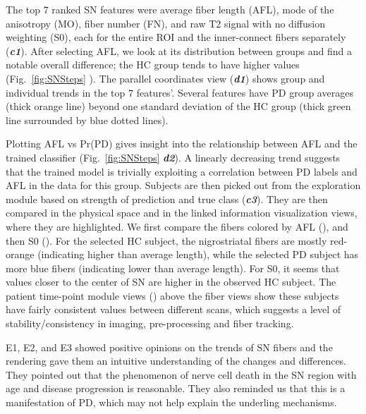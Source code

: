 The top $7$ ranked SN features were average fiber length (AFL), mode of the anisotropy (MO), fiber number (FN), and raw T2 signal with no diffusion weighting (S0), each for the entire ROI and the inner-connect fibers separately (\textbf{\textit{c1}}). After selecting AFL, we look at its distribution between groups and find a notable overall difference; the HC group tends to have higher values (Fig.~\ref{fig:SNSteps} ). The parallel coordinates view (\textbf{\textit{d1}}) shows group and individual trends in the top $7$ features'. Several features have PD group averages (thick orange line) beyond one standard deviation of the HC group (thick green line surrounded by blue dotted lines).

Plotting AFL vs Pr(PD) gives insight into the relationship between AFL and the trained classifier (Fig.~\ref{fig:SNSteps}  \textbf{\textit{d2}}). A linearly decreasing trend suggests that the trained model is trivially exploiting a correlation between PD labels and AFL in the data for this group. Subjects are then picked out from the exploration module based on strength of prediction and true class (\textbf{\textit{c3}}). They are then compared in the physical space and in the linked information visualization views, where they are highlighted. We first compare the fibers colored by AFL (), and then S0 (). For the selected HC subject, the nigrostriatal fibers are mostly red-orange (indicating higher than average length), while the selected PD subject has more blue fibers (indicating lower than average length). For S0, it seems that values closer to the center of SN are higher in the observed HC subject. The patient time-point module views () above the fiber views show these subjects have fairly consistent values between different scans, which suggests a level of stability/consistency in imaging, pre-processing and fiber tracking. 

E1, E2, and E3 showed positive opinions on the trends of SN fibers and the rendering gave them an intuitive understanding of the changes and differences. They pointed out that the phenomenon of nerve cell death in the SN region with age and disease progression is reasonable. They also reminded us that this is a manifestation of PD, which may not help explain the underling mechanisms.


